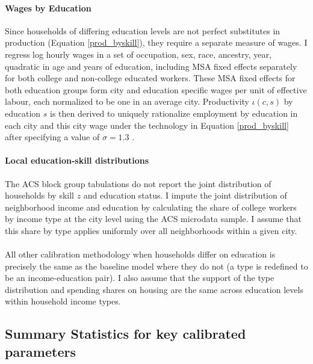 \documentclass[12pt]{article}
\begin{document}
	\paragraph*{Wages by Education} Since households of differing education levels are not perfect substitutes in production (Equation \ref{prod_byskill}), they require a separate measure of wages. I regress log hourly wages in a set of occupation, sex, race, ancestry, year, quadratic in age and years of education, including MSA fixed effects separately for both college and non-college educated workers. These MSA fixed effects for both education groups form city and education specific wages per unit of effective labour, each normalized to be one in an average city. Productivity $\iota(c, s)$ by education $s$ is then derived to uniquely rationalize employment by education in each city and this city wage under the technology in Equation \eqref{prod_byskill} after specifying a value of $\sigma = 1.3$ \citep{card}.
	
	\paragraph*{Local education-skill distributions} The ACS block group tabulations do not report the joint distribution of households by skill $z$ and education status. I impute the joint distribution of neighborhood income and education by calculating the share of college workers by income type at the city level using the ACS microdata sample. I assume that this share by type applies uniformly over all neighborhoods within a given city. 
	
	\paragraph*{}
	All other calibration methodology when households differ on education is precisely the same as the baseline model where they do not (a type is redefined to be an income-education pair). I also assume that the support of the type distribution and spending shares on housing are the same across education levels within household income types. 
	
	
	\subsection{Summary Statistics for key calibrated parameters}\label{Appendix:CalibPara}
	
\end{document}
